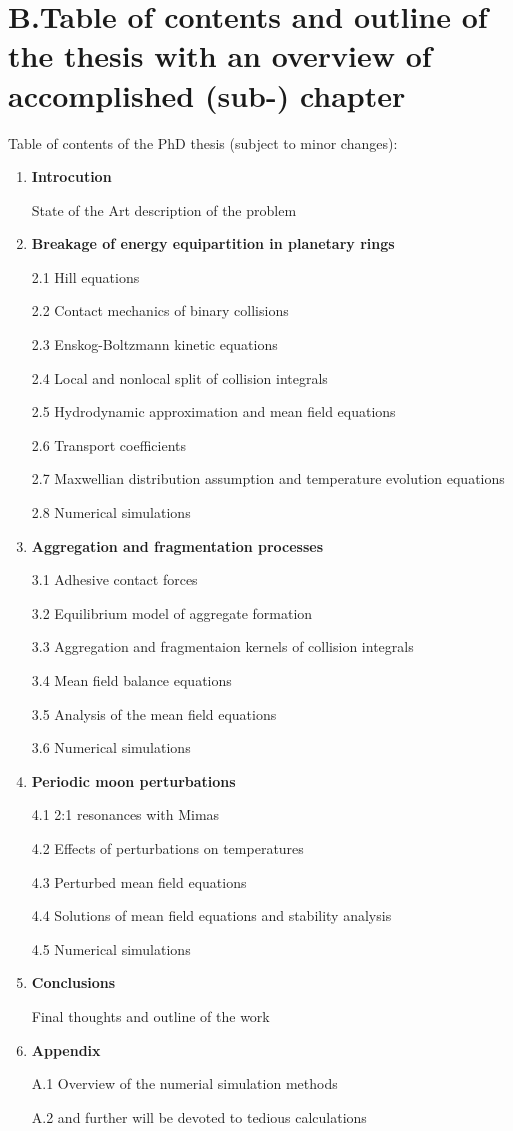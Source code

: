 \documentclass[11pt, notitlepage]{article} %
\begin{document}
\section*{B.Table of contents and outline of the thesis with an overview of accomplished (sub-) chapter}
Table of contents of the PhD thesis (subject to minor changes):
\begin{enumerate}
	\item \textbf{Introcution}
	
		State of the Art description of the problem
	
	\item \textbf{Breakage of energy equipartition in planetary rings}
	
		2.1 Hill equations

		2.2 Contact mechanics of binary collisions

		2.3 Enskog-Boltzmann kinetic equations

		2.4 Local and nonlocal split of collision integrals 

		2.5 Hydrodynamic approximation and mean field equations

		2.6 Transport coefficients

		2.7 Maxwellian distribution assumption and temperature evolution equations

		2.8 Numerical simulations

	\item \textbf{Aggregation and fragmentation processes}
	
		3.1 Adhesive contact forces 

		3.2 Equilibrium model of aggregate formation 

		3.3 Aggregation and fragmentaion kernels of collision integrals 

		3.4 Mean field balance equations

		3.5 Analysis of the mean field equations

		3.6 Numerical simulations

	\item \textbf{Periodic moon perturbations}
	
		4.1 2:1 resonances with Mimas 

		4.2 Effects of perturbations on temperatures

		4.3 Perturbed mean field equations

		4.4 Solutions of mean field equations and stability analysis

		4.5 Numerical simulations

	\item \textbf{Conclusions}

		Final thoughts and outline of the work 

	\item \textbf{Appendix}

		A.1 Overview of the numerial simulation methods

		A.2 and further will be devoted to tedious calculations
	
\end{enumerate}
\end{document}
